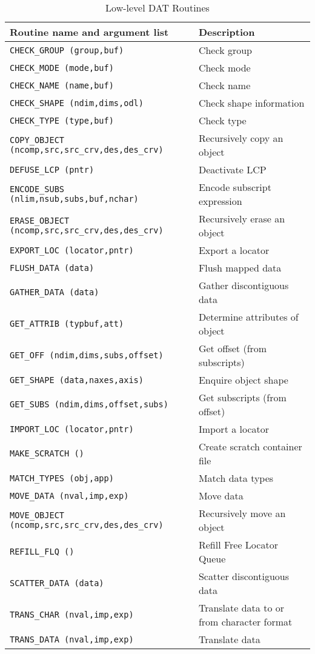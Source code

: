 \begin {table}[htbp]
\begin {center}
\begin {tabular}{||l|l||}
\hline
Routine name and argument list			& Description \\
\hline
{\tt CHECK\_GROUP (group,buf)}			& Check group  \\
{\tt CHECK\_MODE (mode,buf)}			& Check mode  \\
{\tt CHECK\_NAME (name,buf)}			& Check name  \\
{\tt CHECK\_SHAPE (ndim,dims,odl)}		& Check shape information \\
{\tt CHECK\_TYPE (type,buf)}			& Check type  \\
{\tt COPY\_OBJECT (ncomp,src,src\_crv,des,des\_crv)} & Recursively copy an object \\
{\tt DEFUSE\_LCP (pntr)}	       		& Deactivate LCP  \\
{\tt ENCODE\_SUBS (nlim,nsub,subs,buf,nchar)}	& Encode subscript expression \\
{\tt ERASE\_OBJECT  (ncomp,src,src\_crv,des,des\_crv)} & Recursively erase an object \\
{\tt EXPORT\_LOC (locator,pntr)}		& Export a locator \\
{\tt FLUSH\_DATA (data)}			& Flush mapped data  \\
{\tt GATHER\_DATA (data)}			& Gather discontiguous data \\
{\tt GET\_ATTRIB (typbuf,att)}			& Determine attributes of object \\
{\tt GET\_OFF (ndim,dims,subs,offset)}		& Get offset (from subscripts) \\
{\tt GET\_SHAPE (data,naxes,axis)}		& Enquire object shape \\
{\tt GET\_SUBS (ndim,dims,offset,subs)}		& Get subscripts (from offset) \\
{\tt IMPORT\_LOC (locator,pntr)}		& Import a locator \\
{\tt MAKE\_SCRATCH ()}				& Create scratch container file \\
{\tt MATCH\_TYPES (obj,app)}			& Match data types \\
{\tt MOVE\_DATA (nval,imp,exp)}			& Move data \\
{\tt MOVE\_OBJECT (ncomp,src,src\_crv,des,des\_crv)} & Recursively move an object \\
{\tt REFILL\_FLQ ()}				& Refill Free Locator Queue  \\
{\tt SCATTER\_DATA (data)}			& Scatter discontiguous data \\
{\tt TRANS\_CHAR (nval,imp,exp)}		& Translate data to or from character format \\
{\tt TRANS\_DATA (nval,imp,exp)}		& Translate data \\
\hline
\end {tabular}
\caption {Low-level DAT Routines}
\label {low_level_dat_routines}
\end {center}
\end {table}

